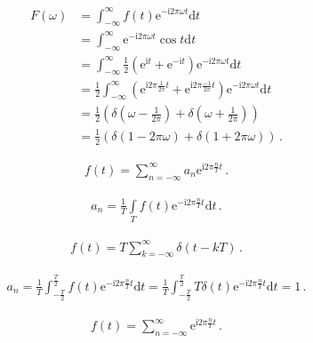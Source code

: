 \begin{align}
    F(\omega) & =\int_{-\infty}^{\infty}f(t)\mathrm{e}^{-\mathrm{i}2\pi\omega t}\mathrm{d}t\nonumber                                                                                                \\
              & =\int_{-\infty}^{\infty}\mathrm{e}^{-\mathrm{i}2\pi\omega t}\cos t\mathrm{d}t\nonumber                                                                                              \\
              & =\int_{-\infty}^{\infty}\frac{1}{2}(\mathrm{e}^{\mathrm{i}t}+\mathrm{e}^{-\mathrm{i}t})\mathrm{e}^{-\mathrm{i}2\pi\omega t}\mathrm{d}t\nonumber                                     \\
              & =\frac{1}{2}\int_{-\infty}^{\infty}(\mathrm{e}^{\mathrm{i}2\pi\frac{1}{2\pi}t}+\mathrm{e}^{\mathrm{i}2\pi\frac{-1}{2\pi}t})\mathrm{e}^{-\mathrm{i}2\pi\omega t}\mathrm{d}t\nonumber \\
              & =\frac{1}{2}(\delta(\omega-\frac{1}{2\pi})+\delta(\omega+\frac{1}{2\pi}))\nonumber                                                                                                  \\
              & =\frac{1}{2}(\delta(1-2\pi\omega)+\delta(1+2\pi\omega))\, .
\end{align}

\begin{align}
    f(t)=\sum\limits_{n=-\infty}^{\infty}a_n\mathrm{e}^{\mathrm{i}2\pi\frac{n}{T}t}\, .
\end{align}

\begin{align}
    a_n=\frac{1}{T}\int\limits_T f(t)\mathrm{e}^{-\mathrm{i}2\pi\frac{n}{T}t}\mathrm{d}t\, .
\end{align}

\begin{align}
    f(t)=T\sum\limits_{k=-\infty}^{\infty}\delta(t-kT)\, .
\end{align}

\begin{align}
    a_n=\frac{1}{T}\int_{-\frac{T}{2}}^{\frac{T}{2}}f(t)\mathrm{e}^{-\mathrm{i}2\pi\frac{n}{T}t}\mathrm{d}t
    =\frac{1}{T}\int_{-\frac{T}{2}}^{\frac{T}{2}}T\delta(t)\mathrm{e}^{-\mathrm{i}2\pi\frac{n}{T}t}\mathrm{d}t
    =1\, .
\end{align}

\begin{align}
    f(t)=\sum\limits_{n=-\infty}^{\infty}\mathrm{e}^{\mathrm{i}2\pi\frac{n}{T}t}\, .
\end{align}

